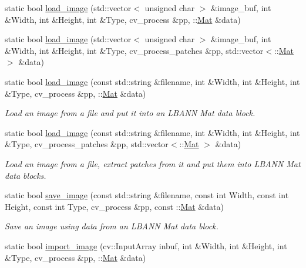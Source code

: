 \begin{DoxyCompactItemize}
static bool \hyperlink{classlbann_1_1image__utils_ae7270652ab69d7b659c2a9ae5a7057ab}{load\+\_\+image} (std\+::vector$<$ unsigned char $>$ \&image\+\_\+buf, int \&Width, int \&Height, int \&Type, cv\+\_\+process \&pp, \+::\hyperlink{base_8hpp_a68f11fdc31b62516cb310831bbe54d73}{Mat} \&data)
\item 
static bool \hyperlink{classlbann_1_1image__utils_a75895e02feffc8b32c6c7d168f856778}{load\+\_\+image} (std\+::vector$<$ unsigned char $>$ \&image\+\_\+buf, int \&Width, int \&Height, int \&Type, cv\+\_\+process\+\_\+patches \&pp, std\+::vector$<$\+::\hyperlink{base_8hpp_a68f11fdc31b62516cb310831bbe54d73}{Mat} $>$ \&data)
\item 
static bool \hyperlink{classlbann_1_1image__utils_a6e55d50736ff8c80c91300488df117a1}{load\+\_\+image} (const std\+::string \&filename, int \&Width, int \&Height, int \&Type, cv\+\_\+process \&pp, \+::\hyperlink{base_8hpp_a68f11fdc31b62516cb310831bbe54d73}{Mat} \&data)
\begin{DoxyCompactList}\small\item\em Load an image from a file and put it into an L\+B\+A\+NN Mat data block. \end{DoxyCompactList}\item 
static bool \hyperlink{classlbann_1_1image__utils_a45ce40d5989cfe65f4d9081335a1e10f}{load\+\_\+image} (const std\+::string \&filename, int \&Width, int \&Height, int \&Type, cv\+\_\+process\+\_\+patches \&pp, std\+::vector$<$\+::\hyperlink{base_8hpp_a68f11fdc31b62516cb310831bbe54d73}{Mat} $>$ \&data)
\begin{DoxyCompactList}\small\item\em Load an image from a file, extract patches from it and put them into L\+B\+A\+NN Mat data blocks. \end{DoxyCompactList}\item 
static bool \hyperlink{classlbann_1_1image__utils_a86e65a4c267319e77ae9e8c65033ac15}{save\+\_\+image} (const std\+::string \&filename, const int Width, const int Height, const int Type, cv\+\_\+process \&pp, const \+::\hyperlink{base_8hpp_a68f11fdc31b62516cb310831bbe54d73}{Mat} \&data)
\begin{DoxyCompactList}\small\item\em Save an image using data from an L\+B\+A\+NN Mat data block. \end{DoxyCompactList}\item 
static bool \hyperlink{classlbann_1_1image__utils_a720f0987ec8eff333bf697ed18aafc93}{import\+\_\+image} (cv\+::\+Input\+Array inbuf, int \&Width, int \&Height, int \&Type, cv\+\_\+process \&pp, \+::\hyperlink{base_8hpp_a68f11fdc31b62516cb310831bbe54d73}{Mat} \&data)

\end{DoxyCompactItemize}
